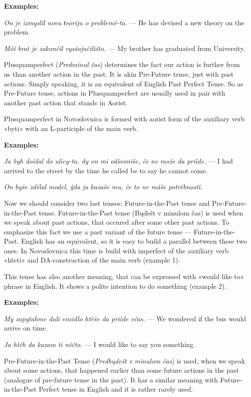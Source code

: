 \textbf{Examples:}

\textit{On je izmyslïl novu ŧeoriju o problemě-ta.} — He has devised a new theory on the problem.

\textit{Môǐ brat je zakončil vysšojučilišto.} — My brother has graduated from University.

Plusquamperfect (\textit{Predminul čas}) determines the fact our action is further from us than another action in the past. It is akin Pre-Future tense, just with past actions. Simply speaking, it is an equivalent of English Past Perfect Tense. So as Pre-Future tense, actions in Plusquamperfect are usually used in pair with another past action that stands in Aorist.

Plusquamperfect in Novoslovnica is formed with aorist form of the auxiliary verb «byti» with an L-participle of the main verb.

\textbf{Examples:}

\textit{Ja byh doǐdal do ulicy-ta, dy on mi odŝvoniše, če ne može da priǐde.} — I had arrived to the street by the time he called be to say he cannot come.

\textit{On byše zdělal model, ĝda ja kazaše mu, če to ne máše potrěbnostï.}

Now we should consider two last tenses: Future-in-the-Past tense and Pre-Future-in-the-Past tense.
Future-in-the-Past tense (Bųdešt v minulom čas) is used when we speak about past actions, that occured after some other past actions. To emphasize this fact we use a past variant of the future tense — Future-in-the-Past. English has an equivalent, so it is easy to build a parallel between these two ones. In Novoslovnica this time is build with imperfect of the auxiliary verb «hteti» and DA-construction of the main verb (example 1).

This tense has also another meaning, that can be expressed with «would like to» phrase in English. It shows a polite intention to do something (example 2).

\textbf{Examples:}

\textit{My zapytahme dali vozidlo htěše da priǐde včas.} — We wondered if the bus would arrive on time.

\textit{Ja htěh da kazam ti něčto.} — I would like to say you something.

Pre-Future-in-the-Past Tense (\textit{Predbųdešt v minulom čas}) is used, when we speak about some actions, that happened earlier than some future actions in the past (analogue of pre-future tense in the past). It has a similar meaning with Future-in-the-Past Perfect tense in English and it is rather rarely used.


